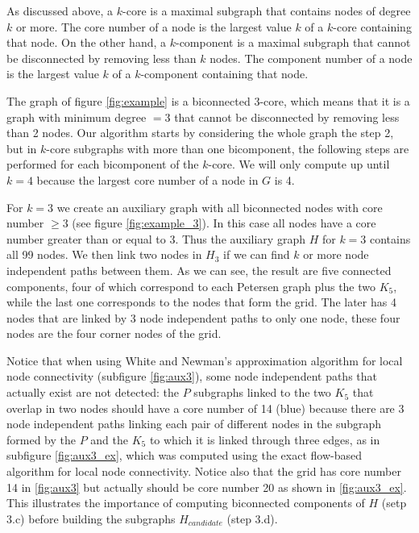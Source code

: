 As discussed above, a $k$-core is a maximal subgraph that contains nodes of degree $k$ or more. The core number of a node is the largest value $k$ of a $k$-core containing that node. On the other hand, a $k$-component is a maximal subgraph that cannot be disconnected by removing less than $k$ nodes. The component number of a node is the largest value $k$ of a $k$-component containing that node.

The graph of figure \ref{fig:example} is a biconnected 3-core, which means that it is a graph with minimum degree $=3$ that cannot be disconnected by removing less than 2 nodes. Our algorithm starts by considering the whole graph the step 2, but in $k$-core subgraphs with more than one bicomponent, the following steps are performed for each bicomponent of the $k$-core. We will only compute up until $k=4$ because the largest core number of a node in $G$ is 4. 

For $k=3$ we create an auxiliary graph with all biconnected nodes with core number $\ge 3$ (see figure \ref{fig:example_3}). In this case all nodes have a core number greater than or equal to 3. Thus the auxiliary graph $H$ for $k=3$ contains all 99 nodes. We then link two nodes in $H_3$ if we can find $k$ or more node independent paths between them. As we can see, the result are five connected components, four of which correspond to each Petersen graph plus the two $K_5$, while the last one corresponds to the nodes that form the grid. The later has 4 nodes that are linked by 3 node independent paths to only one node, these four nodes are the four corner nodes of the grid. 

Notice that when using White and Newman's approximation algorithm for local node connectivity (subfigure \ref{fig:aux3}), some node independent paths that actually exist are not detected: the $P$ subgraphs linked to the two $K_5$ that overlap in two nodes should have a core number of 14 (blue) because there are 3 node independent paths linking each pair of different nodes in the subgraph formed by the $P$ and the $K_5$ to which it is linked through three edges, as in subfigure \ref{fig:aux3_ex}, which was computed using the exact flow-based algorithm for local node connectivity. Notice also that the grid has core number 14 in \ref{fig:aux3} but actually should be core number 20 as shown in \ref{fig:aux3_ex}. This illustrates the importance of computing biconnected components of $H$ (setp 3.c) before building the subgraphs $H_{candidate}$ (step 3.d).

